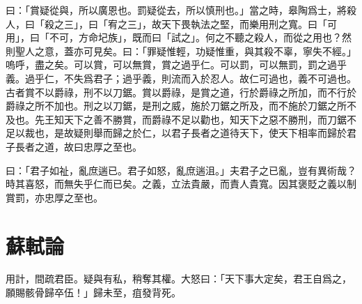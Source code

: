 曰：「賞疑從與，所以廣恩也。罰疑從去，所以慎刑也。」當之時，皋陶爲士，將殺人，曰「殺之三」，曰「宥之三」，故天下畏執法之堅，而樂用刑之寬。曰「可用」，曰「不可，方命圮族」，既而曰「試之」。何之不聽之殺人，而從之用也？然則聖人之意，蓋亦可見矣。曰：「罪疑惟輕，功疑惟重，與其殺不辜，寧失不經。」嗚呼，盡之矣。可以賞，可以無賞，賞之過乎仁。可以罰，可以無罰，罰之過乎義。過乎仁，不失爲君子；過乎義，則流而入於忍人。故仁可過也，義不可過也。古者賞不以爵祿，刑不以刀鋸。賞以爵祿，是賞之道，行於爵祿之所加，而不行於爵祿之所不加也。刑之以刀鋸，是刑之威，施於刀鋸之所及，而不施於刀鋸之所不及也。先王知天下之善不勝賞，而爵祿不足以勸也，知天下之惡不勝刑，而刀鋸不足以裁也，是故疑則舉而歸之於仁，以君子長者之道待天下，使天下相率而歸於君子長者之道，故曰忠厚之至也。

曰：「君子如祉，亂庶遄已。君子如怒，亂庶遄沮。」夫君子之已亂，豈有異術哉？時其喜怒，而無失乎仁而已矣。之義，立法貴嚴，而責人貴寬。因其褒貶之義以制賞罰，亦忠厚之至也。

\section[范增論\quad{\small 蘇軾}]{{\normalsize 蘇軾}\quad{}論}
用計，間疏君臣。疑與有私，稍奪其權。大怒曰：「天下事大定矣，君王自爲之，願賜骸骨歸卒伍！」歸未至，疽發背死。

